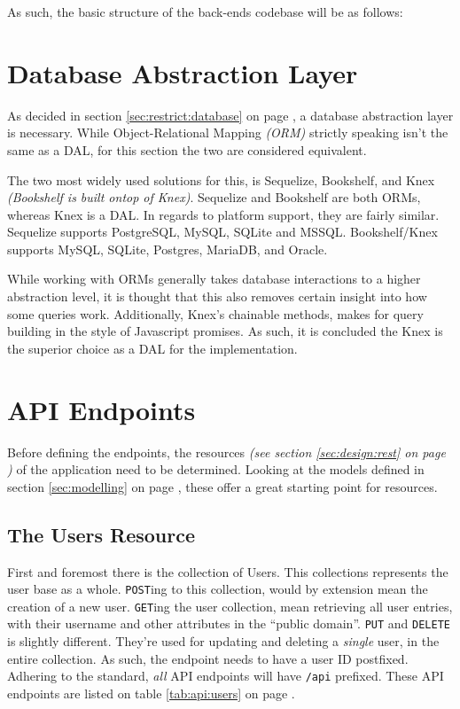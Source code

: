 		As such, the basic structure of the back-ends codebase will be as follows:

	\section{Database Abstraction Layer}
		As decided in section \ref{sec:restrict:database} on page \pageref{sec:restrict:database}, a database abstraction layer is necessary. While Object-Relational Mapping \emph{(ORM)} strictly speaking isn't the same as a DAL, for this section the two are considered equivalent.

		The two most widely used solutions for this, is Sequelize, Bookshelf, and Knex \emph{(Bookshelf is built ontop of Knex)}. Sequelize and Bookshelf are both ORMs, whereas Knex is a DAL. In regards to platform support, they are fairly similar. Sequelize supports PostgreSQL, MySQL, SQLite and MSSQL. Bookshelf/Knex supports MySQL, SQLite, Postgres, MariaDB, and Oracle.

		While working with ORMs generally takes database interactions to a higher abstraction level, it is thought that this also removes certain insight into how some queries work. Additionally, Knex's chainable methods, makes for query building in the style of Javascript promises. As such, it is concluded the Knex is the superior choice as a DAL for the implementation.

	\section{API Endpoints}
		\label{sec:impl:api}
		Before defining the endpoints, the resources \emph{(see section \ref{sec:design:rest} on page \pageref{sec:design:rest})} of the application need to be determined. Looking at the models defined in section \ref{sec:modelling} on page \pageref{sec:modelling}, these offer a great starting point for resources.

		\subsection{The Users Resource}
			First and foremost there is the collection of Users. This collections represents the user base as a whole. \verb=POST=ing to this collection, would by extension mean the creation of a new user. \verb=GET=ing the user collection, mean retrieving all user entries, with their username and other attributes in the ``public domain''. \verb=PUT= and \verb=DELETE= is slightly different. They're used for updating and deleting a \emph{single} user, in the entire collection. As such, the endpoint needs to have a user ID postfixed. Adhering to the standard, \emph{all} API endpoints will have \verb=/api= prefixed. These API endpoints are listed on table \ref{tab:api:users} on page \pageref{tab:api:users}.

